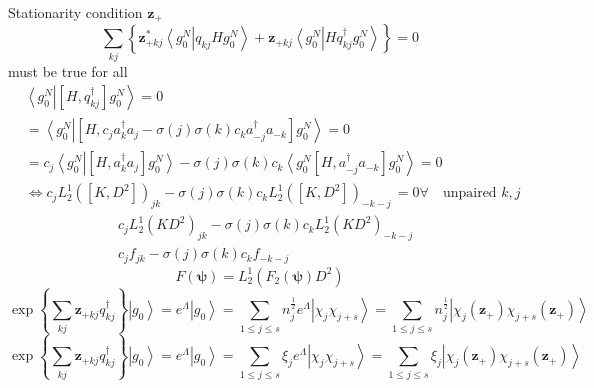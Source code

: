 \documentclass[aps,preprint]{revtex4}%
\begin{document}
Stationarity condition $\mathbf{z}_{+}$
\begin{equation}
\sum_{kj}\left\{  \mathbf{z}_{+kj}^{\ast}\left\langle g_{0}^{N}\right.
\left\vert q_{kj}Hg_{0}^{N}\right\rangle +\mathbf{z}_{+kj}\left\langle
g_{0}^{N}\right.  \left\vert Hq_{kj}^{\dagger}g_{0}^{N}\right\rangle \right\}
=0
\end{equation}
must be true for all
\begin{align}
&  \left\langle g_{0}^{N}\right.  \left\vert \left[  H,q_{kj}^{\dagger
}\right]  g_{0}^{N}\right\rangle =0\\
&  =\left\langle g_{0}^{N}\right.  \left\vert \left[  H,c_{j}a_{k}^{\dagger
}a_{j}-\sigma\left(  j\right)  \sigma\left(  k\right)  c_{k}a_{-j}^{\dagger
}a_{-k}\right]  g_{0}^{N}\right\rangle =0\\
&  =c_{j}\left\langle g_{0}^{N}\right.  \left\vert \left[  H,a_{k}^{\dagger
}a_{j}\right]  \left.  g_{0}^{N}\right\rangle -\sigma\left(  j\right)
\sigma\left(  k\right)  c_{k}\left\langle g_{0}^{N}\right.  \left[
H,a_{-j}^{\dagger}a_{-k}\right]  g_{0}^{N}\right\rangle =0\\
&  \Leftrightarrow c_{j}L_{2}^{1}\left(  \left[  K,D^{2}\right]  \right)
_{jk}-\sigma\left(  j\right)  \sigma\left(  k\right)  c_{k}L_{2}^{1}\left(
\left[  K,D^{2}\right]  \right)  _{-k-j}\,=0\forall\quad\text{unpaired }k,j
\end{align}%
\begin{align}
&  c_{j}L_{2}^{1}\left(  KD^{2}\right)  _{jk}-\sigma\left(  j\right)
\sigma\left(  k\right)  c_{k}L_{2}^{1}\left(  KD^{2}\right)  _{-k-j}\\
&  c_{j}f_{jk}-\sigma\left(  j\right)  \sigma\left(  k\right)  c_{k}f_{-k-j}%
\end{align}%
\begin{equation}
F\left(  \mathbf{\psi}\right)  =L_{2}^{1}\left(  F_{2}\left(  \mathbf{\psi
}\right)  D^{2}\right)
\end{equation}%
\begin{equation}
\exp\left\{  \sum_{kj}\mathbf{z}_{+kj}q_{kj}^{\dagger}\right\}  \left\vert
g_{0}\right\rangle =e^{\Lambda}\left\vert g_{0}\right\rangle =\sum_{1\leq
j\leq s}n_{j}^{\frac{1}{2}}e^{\Lambda}\left\vert \chi_{j}\chi_{j+s}%
\right\rangle =\sum_{1\leq j\leq s}n_{j}^{\frac{1}{2}}\left\vert \chi
_{j}\left(  \mathbf{z}_{+}\right)  \chi_{j+s}\left(  \mathbf{z}_{+}\right)
\right\rangle
\end{equation}%
\begin{equation}
\exp\left\{  \sum_{kj}\mathbf{z}_{+kj}q_{kj}^{\dagger}\right\}  \left\vert
g_{0}\right\rangle =e^{\Lambda}\left\vert g_{0}\right\rangle =\sum_{1\leq
j\leq s}\xi_{j}e^{\Lambda}\left\vert \chi_{j}\chi_{j+s}\right\rangle
=\sum_{1\leq j\leq s}\xi_{j}\left\vert \chi_{j}\left(  \mathbf{z}_{+}\right)
\chi_{j+s}\left(  \mathbf{z}_{+}\right)  \right\rangle
\end{equation}%
\end{document}
